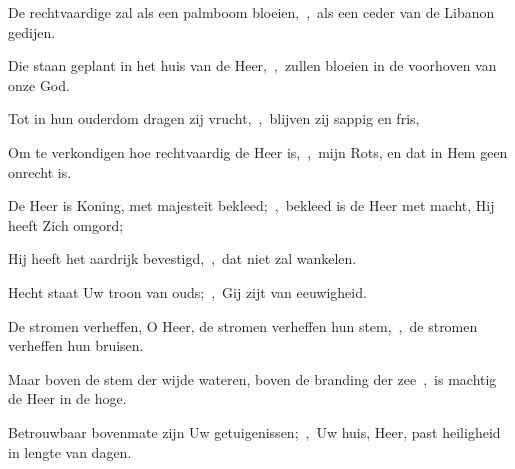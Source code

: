 \documentclass[12pt,twoside,a5paper]{article}
\begin{document}

\begin{halfparskip}
  De rechtvaardige zal als een palmboom bloeien,~\sep\ als een ceder van de Libanon gedijen.

  Die staan geplant in het huis van de Heer,~\sep\ zullen bloeien in de voorhoven van onze God.

  Tot in hun ouderdom dragen zij vrucht,~\sep\ blijven zij sappig en fris,

  Om te verkondigen hoe rechtvaardig de Heer is,~\sep\ mijn Rots, en dat in Hem geen onrecht is.
\end{halfparskip}






\begin{halfparskip}
  De Heer is Koning, met majesteit bekleed;~\sep\ bekleed is de Heer met macht, Hij heeft Zich omgord;


  Hij heeft het aardrijk bevestigd,~\sep\ dat niet zal wankelen.

  Hecht staat Uw troon van ouds;~\sep\ Gij zijt van eeuwigheid.

  De stromen verheffen, O Heer, de stromen verheffen hun stem,~\sep\ de stromen verheffen hun bruisen.

  Maar boven de stem der wijde wateren, boven de branding der zee~\sep\ is machtig de Heer in de hoge.

  Betrouwbaar bovenmate zijn Uw getuigenissen;~\sep\ Uw huis, Heer, past heiligheid in lengte van dagen.
\end{halfparskip}


\end{document}
